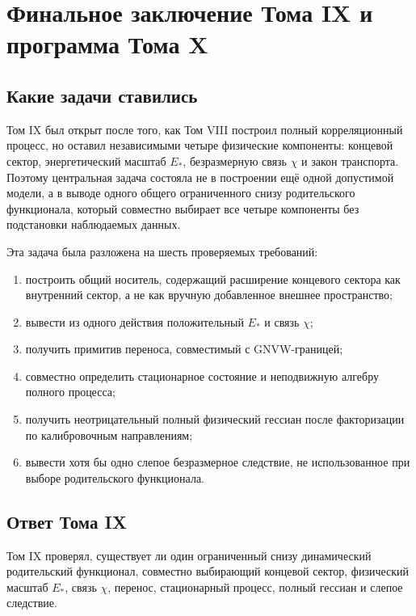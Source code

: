 \chapter{Финальное заключение Тома IX и программа Тома X}
\label{ch:v9-final-conclusion-tome10-program}

\section{Какие задачи ставились}

Том IX был открыт после того, как Том VIII построил полный корреляционный
процесс, но оставил независимыми четыре физические компоненты: концевой сектор,
энергетический масштаб $E_*$, безразмерную связь $\chi$ и закон транспорта.
Поэтому центральная задача состояла не в построении ещё одной допустимой
модели, а в выводе одного общего ограниченного снизу родительского функционала,
который совместно выбирает все четыре компоненты без подстановки наблюдаемых данных.

Эта задача была разложена на шесть проверяемых требований:
\begin{enumerate}
\item построить общий носитель, содержащий расширение концевого сектора как внутренний
сектор, а не как вручную добавленное внешнее пространство;
\item вывести из одного действия положительный $E_*$ и связь $\chi$;
\item получить примитив переноса, совместимый с GNVW-границей;
\item совместно определить стационарное состояние и неподвижную алгебру полного процесса;
\item получить неотрицательный полный физический гессиан после факторизации по
калибровочным направлениям;
\item вывести хотя бы одно слепое безразмерное следствие, не использованное
при выборе родительского функционала.
\end{enumerate}

\section{Ответ Тома IX}

Том IX проверял, существует ли один ограниченный снизу динамический
родительский функционал, совместно выбирающий концевой сектор, физический
масштаб $E_*$, связь $\chi$, перенос, стационарный процесс, полный гессиан
и слепое следствие.

